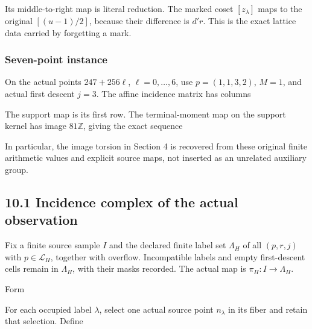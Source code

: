 
Its middle-to-right map is literal reduction. The marked coset
\([z_\lambda]\) maps to the original \([(u-1)/2]\), because their
difference is \(d'r\). This is the exact lattice data carried by
forgetting a mark.

\subsubsection{Seven-point instance}

On the actual points \(247+256\ell\), \(\ell=0,\ldots,6\), use
\(p=(1,1,3,2)\), \(M=1\), and actual first descent \(j=3\). The affine
incidence matrix has columns


The support map is its first row. The terminal-moment map on the support
kernel has image \(81\mathbb Z\), giving the exact sequence


In particular, the image torsion in Section 4 is recovered from these
original finite arithmetic values and explicit source maps, not inserted
as an unrelated auxiliary group.

\subsection{10.1 Incidence complex of the actual observation}

Fix a finite source sample \(I\) and the declared finite label set
\(\Lambda_H\) of all \((p,r,j)\) with \(p\in\mathcal L_H\), together
with overflow. Incompatible labels and empty first-descent cells remain
in \(\Lambda_H\), with their masks recorded. The actual map is
\(\pi_H:I\to\Lambda_H\).

Form


For each occupied label \(\lambda\), select one actual source point
\(n_\lambda\) in its fiber and retain that selection. Define


